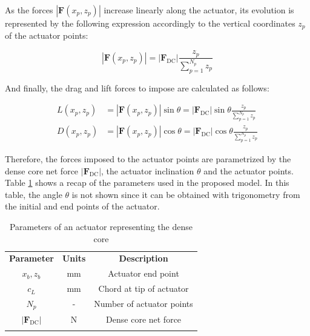 As the forces $| \textbf{F} \left( x_p, z_p \right)|$ increase linearly along the actuator, its evolution is represented by the following expression accordingly to the vertical coordinates $z_p$ of the actuator points:

\begin{equation}
|\textbf{F} \left( x_p, z_p \right) | = | \textbf{F}_\mathrm{DC} | \frac{z_p}{\sum_{p=1}^{N_p} z_p}
\end{equation}

And finally, the drag and lift forces to impose are calculated as follows:

\begin{subequations}
\label{eq:ALM_SLI_lift_drag_definitions}
\begin{align}
L \left( x_p, z_p \right) &= |\textbf{F} \left( x_p, z_p \right) | \sin \theta = | \textbf{F}_\mathrm{DC} | \sin \theta \frac{z_p}{\sum_{p=1}^{N_p} z_p} \\
D \left( x_p, z_p \right) &= |\textbf{F} \left( x_p, z_p \right) | \cos \theta = | \textbf{F}_\mathrm{DC} | \cos \theta \frac{z_p}{\sum_{p=1}^{N_p} z_p}
\end{align}
\end{subequations}

Therefore, the forces imposed to the actuator points are parametrized by the dense core net force $| \textbf{F}_\mathrm{DC} |$, the actuator inclination $\theta$ and the actuator points. Table \ref{tab:alm_parameters} shows a recap of the parameters used in the proposed model. In this table, the angle $\theta$ is not shown since it can be obtained with trigonometry from the initial and end points of the actuator. %

\begin{table}[!h]
\centering
\caption{Parameters of an actuator representing the dense core}
\begin{tabular}{ccc}
\thickhline
\textbf{Parameter} & \textbf{Units} & \textbf{Description} \\ 
\thickhline
$x_b, z_b$ & mm & Actuator end point  \\
$c_L$ & mm & Chord at tip of actuator \\
$N_p$ & - & Number of actuator points \\
$| \textbf{F}_\mathrm{DC} |$ & N & Dense core net force\\
\thickhline 
\end{tabular}
\label{tab:alm_parameters}
\end{table}



